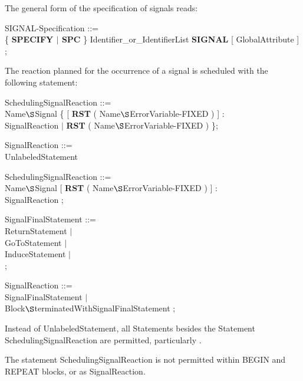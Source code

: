 The general form of the specification of signals reads:

SIGNAL-Specification ::=\\
\x \{ {\bf SPECIFY  $\mid$  SPC} \} Identifier\_or\_IdentifierList 
{\bf SIGNAL} [ GlobalAttribute ] ;

The reaction planned for the occurrence of a signal is scheduled with
the following statement:

\begin{removed}
SchedulingSignalReaction ::=\\
 Name$\S $Signal \{ [ {\bf RST} ( Name$\S $ErrorVariable-FIXED ) ] :\\
\x \x SignalReaction $\mid$ {\bf RST} ( Name$\S $ErrorVariable-FIXED ) \};

SignalReaction ::=\\
\x UnlabeledStatement
\end{removed}
\begin{added}
SchedulingSignalReaction ::=\\
 Name$\S $Signal [ {\bf RST} ( Name$\S $ErrorVariable-FIXED ) ] :\\
\x \x SignalReaction ;

SignalFinalStatement ::= \\
\x ReturnStatement $\mid$ \\
\x GoToStatement $\mid$ \\
\x InduceStatement $\mid$ \\
 ;

SignalReaction ::=\\
\x SignalFinalStatement $\mid$ \\
\x Block$\S $terminatedWithSignalFinalStatement ;
\end{added}

Instead of UnlabeledStatement, all Statements besides the
Statement SchedulingSignalReaction are permitted, particularly
.

The statement SchedulingSignalReaction is not permitted within BEGIN
and REPEAT blocks, or as SignalReaction.

